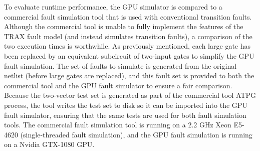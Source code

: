 To evaluate runtime performance, the GPU simulator is compared to a commercial fault simulation tool that is used with conventional transition faults.
%
Although the commercial tool is unable to fully implement the features of the TRAX fault model (and instead simulates transition faults), a comparison of the two execution times is worthwhile.
%
As previously mentioned, each large gate has been replaced by an equivalent subcircuit of two-input gates to simplify the GPU fault simulation.
%
The set of faults to simulate is generated from the original netlist (before large gates are replaced), and this fault set is provided to both the commercial tool and the GPU fault simulator to ensure a fair comparison.
%
Because the two-vector test set is generated as part of the commercial tool ATPG process, the tool writes the test set to disk so it can be imported into the GPU fault simulator, ensuring that the same tests are used for both fault simulation tools.
%
The commercial fault simulation tool is running on a 2.2 GHz Xeon E5-4620 (single-threaded fault simulation), and the GPU fault simulation is running on a Nvidia GTX-1080 GPU.

